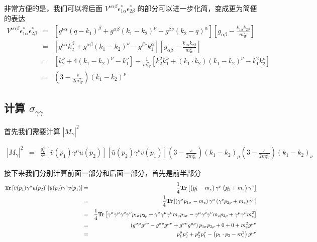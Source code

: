 \documentclass{article}
\newcommand{\Tr}{\mathbf{Tr}}
\begin{document}
非常方便的是，我们可以将后面 $V^{\nu\alpha\beta}\epsilon_{1\alpha}^* \epsilon_{2\beta}^*$ 的部分可以进一步化简，变成更为简便的表达
\begin{eqnarray*}
    V^{\nu\alpha\beta}\epsilon_{1\alpha}^* \epsilon_{2\beta}^* &=& \left[g^{\nu\alpha}(q - k_1)^\beta + g^{\alpha\beta}(k_1 - k_2)^\nu + g^{\beta\nu}(k_2 - q)^\alpha\right]\left[g_{\alpha\beta} - \frac{k_{1\alpha}k_{2\beta}}{m_W^2}\right] \\
    &=& \left[g^{\nu\alpha}k_2^\beta + g^{\alpha\beta}(k_1 - k_2)^\nu - g^{\beta\nu}k_1^\alpha\right]\left[g_{\alpha\beta} - \frac{k_{1\alpha}k_{2\beta}}{m_W^2}\right] \\
    &=& \left[k_2^\nu + 4(k_1 - k_2)^\nu - k_1^\nu\right] - \frac{1}{m_W^2}\left[k_2^2 k_1^\nu + (k_1 \cdot k_2) (k_1 - k_2)^\nu - k_1^2 k_2^\nu\right] \\
    &=& \left(3 - \frac{s}{2m_W^2}\right) (k_1 - k_2)^\nu
\end{eqnarray*}




\subsection{计算 $\sigma_{\gamma\gamma}$}
首先我们需要计算 $\left|M_{\gamma}\right|^2$

\begin{eqnarray*}
    \left|M_{\gamma}\right|^2 &=& \frac{g_e^4}{s^2}\left[\bar{v}(p_1)\gamma^\mu u(p_2)\right]\left[\bar{u}(p_2)\gamma^\nu v(p_1)\right]\left(3 - \frac{s}{2m_W^2}\right) (k_1 - k_2)_\mu\left(3 - \frac{s}{2m_W^2}\right) (k_1 - k_2)_\nu
\end{eqnarray*}

接下来我们分别计算前面一部分和后面一部分，首先是前半部分
\begin{eqnarray*}
    \mathbf{Tr}\left[\bar{v}(p_1)\gamma^\mu u(p_2)\right]\left[\bar{u}(p_2)\gamma^\nu v(p_1)\right] &=& \frac{1}{4}\mathbf{Tr} \left[\left(\slashed{p_1} - m_e\right)\gamma^\mu \left(\slashed{p_2} + m_e\right)\gamma^\nu\right] \\
    &=& \frac{1}{4}\Tr\left[\left(\gamma^\sigma p_{1\sigma} - m_e\right)\gamma^\mu \left(\gamma^\rho p_{2\rho} + m_e\right)\gamma^\nu\right] \\
    &=& \frac{1}{4}\Tr\left[\gamma^\sigma \gamma^\mu \gamma^\rho \gamma^\nu p_{1\sigma}p_{2\rho} + \gamma^\sigma \gamma^\mu \gamma^\nu m_e p_{1\sigma} - \gamma^\mu \gamma^\rho \gamma^\nu m_e p_{2\rho} + \gamma^\mu \gamma^\nu m_e^2\right] \\
    &=& \left(g^{\sigma\mu}g^{\rho\nu} - g^{\sigma\rho}g^{\mu\nu} + g^{\sigma\nu}g^{\mu\rho}\right)p_{1\sigma}p_{2\rho} + 0 + 0 + m_e^2g^{\mu\nu} \\
    &=& p_1^\mu p_2^\nu + p_2^\mu p_1^\nu - \left(p_1 \cdot p_2 - m_e^2\right)g^{\mu\nu}
\end{eqnarray*}
\end{document}
